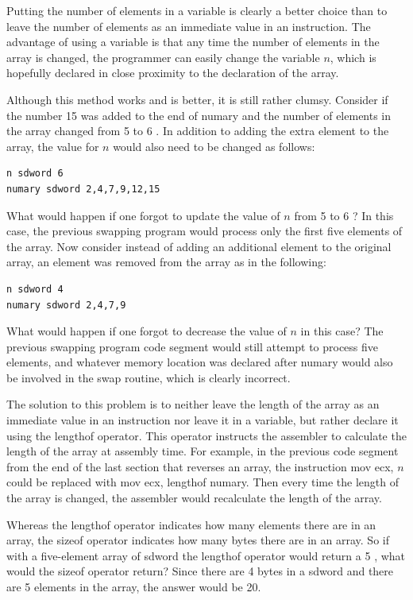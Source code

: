 \documentclass[10pt]{book}
\begin{document}
\begin{center}
\begin{center}
\begin{center}
Putting the number of elements in a variable is clearly a better choice than to leave the number of elements as an immediate value in an instruction. The advantage of using a variable is that any time the number of elements in the array is changed, the programmer can easily change the variable $n$, which is hopefully declared in close proximity to the declaration of the array.

Although this method works and is better, it is still rather clumsy. Consider if the number 15 was added to the end of numary and the number of elements in the array changed from 5 to 6 . In addition to adding the extra element to the array, the value for $n$ would also need to be changed as follows:


\begin{verbatim}
n sdword 6
numary sdword 2,4,7,9,12,15
\end{verbatim}

What would happen if one forgot to update the value of $n$ from 5 to 6 ? In this case, the previous swapping program would process only the first five elements of the array. Now consider instead of adding an additional element to the original array, an element was removed from the array as in the following:

\begin{verbatim}
n sdword 4
numary sdword 2,4,7,9
\end{verbatim}

What would happen if one forgot to decrease the value of $n$ in this case? The previous swapping program code segment would still attempt to process five elements, and whatever memory location was declared after numary would also be involved in the swap routine, which is clearly incorrect.

The solution to this problem is to neither leave the length of the array as an immediate value in an instruction nor leave it in a variable, but rather declare it using the lengthof operator. This operator instructs the assembler to calculate the length of the array at assembly time. For example, in the previous code segment from the end of the last section that reverses an array, the instruction mov ecx, $n$ could be replaced with mov ecx, lengthof numary. Then every time the length of the array is changed, the assembler would recalculate the length of the array.

Whereas the lengthof operator indicates how many elements there are in an array, the sizeof operator indicates how many bytes there are in an array. So if with a five-element array of sdword the lengthof operator would return a 5 , what would the sizeof operator return? Since there are 4 bytes in a sdword and there are 5 elements in the array, the answer would be 20.


\end{center}
\end{center}
\end{center}
\end{document}
